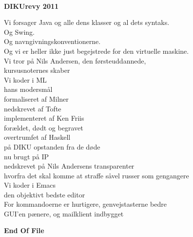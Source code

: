 \newpage

\begin{center}
\\
\vspace{0.5cm}
\noindent \textbf{DIKUrevy 2011}\\
\vspace{1cm}

\begin{minipage}{0.55\textwidth}
\begin{center}
\noindent Vi forsager Java og alle dens klasser og al dets syntaks.\\
Og Swing.\\
Og navngivningskonventionerne.\\
Og vi er heller ikke just begejstrede for den virtuelle maskine.\\
\vspace{0.4cm}
\noindent Vi tror på Nils Andersen, den førsteuddannede,\\
kursusnoternes skaber\\
\vspace{0.4cm}
\noindent Vi koder i ML\\
hans modersmål\\
formaliseret af Milner\\
nedskrevet af Tofte\\
implementeret af Ken Friis\\
forældet, dødt og begravet\\
overtrumfet af Haskell\\
på DIKU opstanden fra de døde\\
nu brugt på IP\\
nedskrevet på Nils Andersens transparenter\\
hvorfra det skal komme at straffe såvel russer som gengangere\\
\vspace{0.4cm}
\noindent Vi koder i Emacs\\
den objektivt bedste editor\\
For kommandoerne er hurtigere, genvejstasterne bedre\\
GUI'en pænere, og mailklient indbygget\\
\end{center}
\end{minipage}
\vspace{1cm}

\noindent \textbf{End Of File}\\
\end{center}


